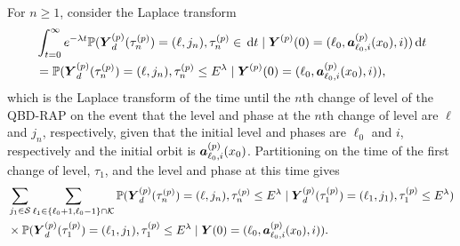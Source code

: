 For \(n\geq 1\), consider the Laplace transform 
\begin{align}
	&\int_{t=0}^\infty e^{-\lambda t} \mathbb P(\boldsymbol Y_d^{(p)}(\tau_n^{(p)}) = (\ell, j_n), \tau_{n}^{(p)}\in \, \mathrm{d} t
	 \mid \boldsymbol Y^{(p)}(0)=(\ell_0,\boldsymbol  a_{\ell_0,i}^{(p)}(x_0),i)) \, \mathrm{d} t \nonumber 
	 \\&=\mathbb P(\boldsymbol Y_d^{(p)}(\tau_n^{(p)}) = (\ell, j_n), \tau_{n}^{(p)}\leq E^{\lambda}
	 \mid \boldsymbol Y^{(p)}(0)=(\ell_0, \boldsymbol  a_{\ell_0,i}^{(p)}(x_0), i)),\nonumber 
\end{align}
which is the Laplace transform of the time until the \(n\)th change of level of the QBD-RAP on the event that the level and phase at the \(n\)th change of level are \(\ell\) and \(j_n\), respectively, given that the initial level and phases are \(\ell_0\) and \(i\), respectively and the initial orbit is \(\boldsymbol a_{\ell_0,i}^{(p)}(x_0)\). Partitioning on the time of the first change of level, \(\tau_1\), and the level and phase at this time gives
\begin{align}
	&\sum_{j_1\in\mathcal S}\sum_{\ell_1\in\{\ell_0+1,\ell_0-1\}\cap \mathcal K}\mathbb P(\boldsymbol Y_d^{(p)}(\tau_n^{(p)}) = (\ell, j_n), \tau_{n}^{(p)}\leq E^\lambda 
	 \mid \boldsymbol Y_d^{(p)}(\tau_1^{(p)})=(\ell_1, j_1), \tau_1^{(p)}\leq E^\lambda ) \nonumber
	 \\&\times \mathbb P(\boldsymbol Y_d^{(p)}(\tau_1^{(p)})=(\ell_1, j_1), \tau_{1}^{(p)}\leq E^\lambda
	 \mid \boldsymbol Y(0)=(\ell_0, \boldsymbol  a_{\ell_0,i}^{(p)}(x_0), i)).
	 \label{eqn: mnebrb2}
\end{align}
